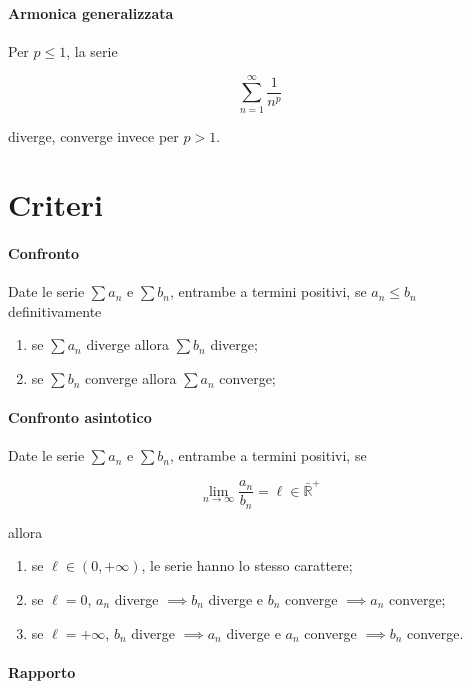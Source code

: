 \documentclass[12pt,a4paper]{report}
\numberwithin{equation}{section}
\theoremstyle{definition}
\theoremstyle{remark}
\begin{document}
\paragraph{Armonica generalizzata}

Per $ p \leq 1$, la serie

\begin{equation}
\sum_{n=1}^\infty \frac{1}{n^p}
\end{equation}

diverge, converge invece per $p>1$.

\section{Criteri}

\paragraph{Confronto} Date le serie $\sum a_n$ e $\sum b_n$, entrambe a termini positivi, se $a_n \leq b_n$ definitivamente

\begin{enumerate}
\item se $\sum a_n$ diverge allora $\sum b_n$ diverge;
\item se $\sum b_n$ converge allora $\sum a_n$ converge;
\end{enumerate}

\paragraph{Confronto asintotico} Date le serie $\sum a_n$ e $\sum b_n$, entrambe a termini positivi, se

\begin{equation}
\lim_{n \rightarrow \infty} \frac{a_n}{b_n} = \ell \in \bar{\mathbb{R}}^+
\end{equation}

allora

\begin{enumerate}
\item se $\ell \in (0, +\infty )$, le serie hanno lo stesso carattere;
\item se $\ell = 0$, $a_n$ diverge $\implies b_n$ diverge e $b_n$ converge $\implies a_n$ converge;
\item se $\ell = +\infty$, $b_n$ diverge $\implies a_n$ diverge e $a_n$ converge $\implies b_n$ converge.
\end{enumerate}

\paragraph{Rapporto}
\end{document}
